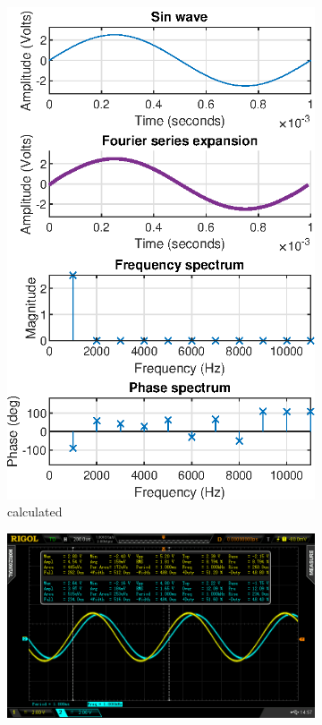 \documentclass[notitlepage, a4paper, 11pt]{article}
\begin{document}
	\begin{figure}[H]
		\centering
		\begin{subfigure}[][][t]{0.3\textwidth}
			\includegraphics[width=\textwidth]{../Matlab/img/sin}
			\caption{calculated}
			\label{fig:calc-signals-a}
		\end{subfigure}
		\quad
		\begin{subfigure}[][][t]{0.3\textwidth}
			\includegraphics[width=\textwidth, trim=85 50 112 45, clip]{../img/osc/DS2_QuickPrint5.png}

\end{subfigure}
\end{figure}
\end{document}
